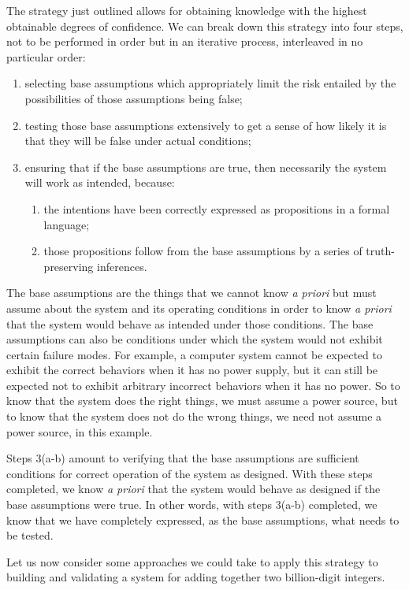 \documentclass[11pt]{article}
\begin{document}
The strategy just outlined allows for obtaining knowledge with the highest obtainable
degrees of confidence. We can break down this strategy into four steps, not to be
performed in order but in an iterative process, interleaved in no particular order:
\begin{enumerate}
	\item selecting base assumptions which appropriately limit the risk entailed
		by the possibilities of those assumptions being false;
	\item testing those base assumptions extensively to get a sense of how
		likely it is that they will be false under actual conditions;
	\item ensuring that if the base assumptions are true, then necessarily the
		system will work as intended, because:
		\begin{enumerate}
			\item the intentions have been correctly expressed as propositions in a formal language;
			\item those propositions follow from the base assumptions by a series of truth-preserving inferences.
		\end{enumerate}
\end{enumerate}
The base assumptions are the things that we cannot know \emph{a priori}\/ but must
assume about the system and its operating conditions in order to know \emph{a priori}\/ that
the system would behave as intended under those conditions. The base assumptions can
also be conditions under which the system would not exhibit certain failure modes.
For example, a computer system cannot be expected to exhibit the correct behaviors when it has
no power supply, but it can still be expected not to exhibit arbitrary incorrect behaviors
when it has no power. So to know that the system does the right things, we must assume
a power source, but to know that the system does not do the wrong things, we need not assume
a power source, in this example.

Steps 3(a-b) amount to verifying that the base assumptions are sufficient conditions
for correct operation of the system as designed. With these steps completed, we know
\emph{a priori}\/ that the system would behave as designed if the base assumptions were
true. In other words, with steps 3(a-b) completed, we know that we have completely
expressed, as the base assumptions, what needs to be tested.

Let us now consider some approaches we could take to apply this strategy to building
and validating a system for adding together two billion-digit integers.
\end{document}
